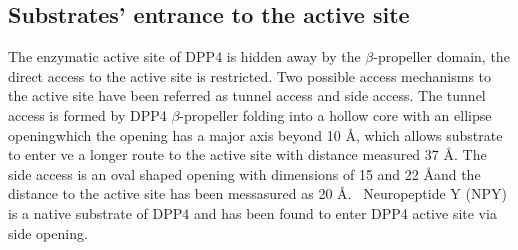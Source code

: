\subsection{Substrates' entrance to the active site}

The enzymatic active site of DPP4 is hidden away by the $\beta$-propeller domain, the direct access to the active site is restricted. Two possible access mechanisms to the active site have been referred as tunnel access and side access. The tunnel access is formed by DPP4 $\beta$-propeller  folding into a hollow core with an ellipse openingwhich the opening has a major axis beyond 10 \AA, which allows substrate to enter ve a longer route to the active site with distance measured 37 \AA. The side access is an oval shaped opening with dimensions of 15 and 22 \AA and the distance to the active site has been messasured as 20 \AA.~\cite{Engel_2003, Rasmussen_2002,Weihofen_2004} Neuropeptide Y (NPY) is a native substrate of DPP4 and has been found to enter DPP4 active site via side opening. ~\cite{Aertgeerts_2004}